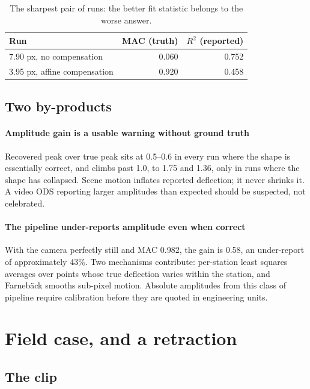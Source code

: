 \documentclass[preprint,12pt]{elsarticle}
\begin{document}
\begin{table}[htbp]
\centering
\caption{The sharpest pair of runs: the better fit statistic belongs to the
worse answer.}
\label{tab:pair}
\begin{tabular}{lrr}
\toprule
Run & MAC (truth) & $R^2$ (reported)\\
\midrule
7.90 px, no compensation     & 0.060 & 0.752\\
3.95 px, affine compensation & 0.920 & 0.458\\
\bottomrule
\end{tabular}
\end{table}

\subsection{Two by-products}

\paragraph{Amplitude gain is a usable warning without ground truth}
Recovered peak over true peak sits at 0.5--0.6 in every run where the shape
is essentially correct, and climbs past 1.0, to 1.75 and 1.36, only in runs
where the shape has collapsed. Scene motion inflates reported deflection; it
never shrinks it. A video ODS reporting larger amplitudes than expected
should be suspected, not celebrated.

\paragraph{The pipeline under-reports amplitude even when correct}
With the camera perfectly still and MAC 0.982, the gain is 0.58, an
under-report of approximately 43\%. Two mechanisms contribute: per-station
least squares averages over points whose true deflection varies within the
station, and Farneb\"ack smooths sub-pixel motion. Absolute amplitudes from
this class of pipeline require calibration before they are quoted in
engineering units.

\section{Field case, and a retraction}
\label{sec:field}

\subsection{The clip}
\end{document}
